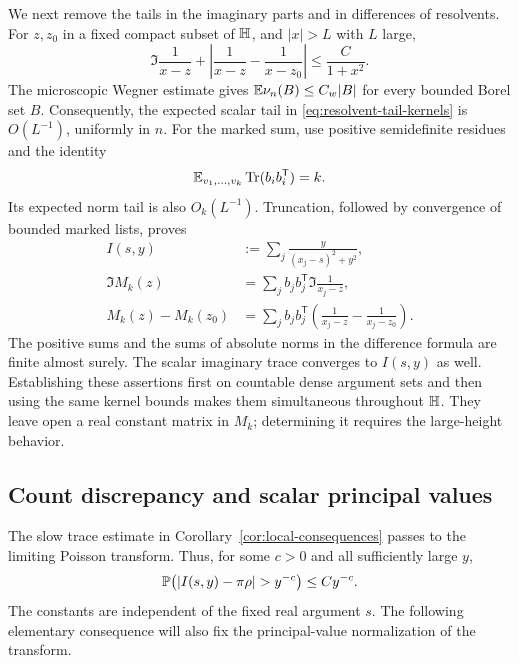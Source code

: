 We next remove the tails in the imaginary parts and in differences of
resolvents. For $z,z_0$ in a fixed compact subset of $\mathbb H$, and $|x|>L$
with $L$ large,
\begin{equation}\label{eq:resolvent-tail-kernels}
 \Im\frac1{x-z}
 +\left|\frac1{x-z}-\frac1{x-z_0}\right|
                  \le \frac{C}{1+x^2}.
\end{equation}
The microscopic Wegner estimate gives
$\mathbb E\nu_n(B)\le C_w|B|$ for every bounded Borel set $B$.
Consequently, the expected scalar tail in
\eqref{eq:resolvent-tail-kernels} is $O(L^{-1})$, uniformly in $n$.
For the marked sum, use positive semidefinite residues and the identity
\[
 \mathbb E_{v_1,\ldots,v_k}\operatorname{Tr}(b_i b_i^{\mathsf T})=k.
\]
Its expected norm tail is also $O_k(L^{-1})$. Truncation, followed by
convergence of bounded marked lists, proves
\begin{align}
 I(s,y)&:=\sum_j\frac{y}{(x_j-s)^2+y^2},\label{eq:limiting-poisson}\\
 \Im M_k(z)&=\sum_j b_j b_j^{\mathsf T}\Im\frac1{x_j-z},
       \label{eq:matrix-imaginary-sum}\\
 M_k(z)-M_k(z_0)
   &=\sum_j b_j b_j^{\mathsf T}
            \left(\frac1{x_j-z}-\frac1{x_j-z_0}\right).
       \label{eq:matrix-difference-sum}
\end{align}
The positive sums and the sums of absolute norms in the difference
formula are finite almost surely. The scalar imaginary trace converges
to $I(s,y)$ as well. Establishing these assertions first on countable
dense argument sets and then using the same kernel bounds makes them
simultaneous throughout $\mathbb H$. They leave open a real constant matrix
in $M_k$; determining it requires the large-height behavior.

\subsection{Count discrepancy and scalar principal values}

The slow trace estimate in Corollary~\ref{cor:local-consequences}
passes to the limiting Poisson transform. Thus, for some $c>0$ and all
sufficiently large $y$,
\begin{equation}\label{eq:slow-limiting-trace}
 \PP\bigl(|I(s,y)-\pi\rho|>y^{-c}\bigr)\le Cy^{-c}.
\end{equation}
The constants are independent of the fixed real argument $s$.
The following elementary consequence will also fix the principal-value
normalization of the transform.


